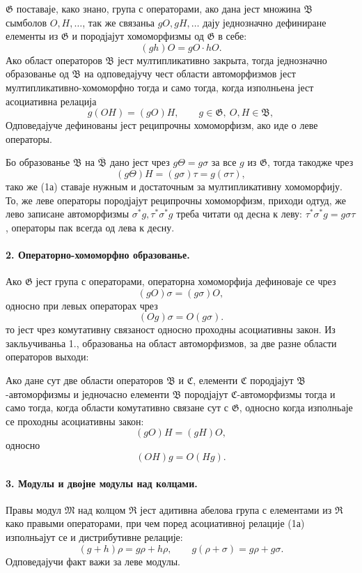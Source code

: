 ﻿\documentclass[11pt]{article}
\providecommand{\frB}{\mathfrak B}
\providecommand{\frC}{\mathfrak C}
\providecommand{\frG}{\mathfrak G}
\providecommand{\frM}{\mathfrak M}
\providecommand{\frR}{\mathfrak R}
\begin{document}
\(\frG\) поставаје, како знано, група с операторами, ако дана јест множина \(\frB\) сымболов \(O,H,\ldots\), так же связаньа \(gO,gH,\ldots\) дају једнозначно дефиниране елементы из \(\frG\) и породјајут хомоморфизмы од \(\frG\) в себе:
\[
        (gh)O=gO\cdot hO .
\]
Ако област операторов \(\frB\) јест мултипликативно закрыта, тогда једнозначно образованье од \(\frB\) на одповедајучу чест области автоморфизмов јест мултипликативно-хомоморфно тогда и само тогда, когда изполньена јест асоциативна релација
\[
        g(OH)=(gO)H, \qquad g\in\frG,\ O,H\in\frB,                       \tag{1a}
\]
Одповедајуче дефинованы јест реципрочны хомоморфизм, ако иде о леве операторы.

Бо образованье \(\frB\) на \(\overline{\frB}\) дано јест чрез \(g\Theta=g\sigma\) за все \(g\) из \(\frG\), тогда такодже чрез
\[
        (g\Theta)H=(g\sigma)\tau=g(\sigma\tau),
\]
тако же (1а) ставаје нужным и достаточным за мултипликативну хомоморфију. То, же леве операторы породјајут реципрочны хомоморфизм, приходи одтуд, же лево записане автоморфизмы \(\sigma^\ast g,\tau^\ast\sigma^\ast g\) треба читати од десна к леву: \(\tau^\ast\sigma^\ast g=g\sigma\tau\), операторы пак всегда од лева к десну.

\paragraph{2. Операторно-хомоморфно образованье.}
Ако \(\frG\) јест група с операторами, операторна хомоморфија дефиноваје се чрез
\[
        (gO)\sigma=(g\sigma)O,                                          \tag{2}
\]
односно при левых операторах чрез
\[
        (Og)\sigma=O(g\sigma).                                          \tag{2*}
\]
то јест чрез комутативну связаност односно проходны асоциативны закон. Из закльучиваньа 1., образованьа на област автоморфизмов, за две разне области операторов выходи:

Ако дане сут две области операторов \(\frB\) и \(\frC\), елементи \(\frC\) породјајут \(\frB\)-автоморфизмы и једночасно елементи \(\frB\) породјајут \(\frC\)-автоморфизмы тогда и само тогда, когда области комутативно связане сут с \(\frG\), односно когда изполньаје се проходны асоциативны закон:
\[
        (gO)H=(gH)O,                                                    \tag{2a}
\]
односно
\[
        (OH)g=O(Hg).                                                    \tag{2a*}
\]

\paragraph{3. Модулы и двојне модулы над колцами.}
Правы модул \(\frM\) над колцом \(\frR\) јест адитивна абелова група с елементами из \(\frR\) како правыми операторами, при чем поред асоциативној релације (1а) изполньајут се и дистрибутивне релације:
\[
        (g+h)\rho=g\rho+h\rho,\qquad
        g(\rho+\sigma)=g\rho+g\sigma.                                  \tag{3a}
\]
Одповедајучи факт важи за леве модулы.
\end{document}
